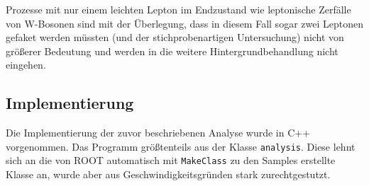 Prozesse mit nur einem leichten Lepton im Endzustand wie leptonische Zerfälle
von W-Bosonen sind mit der Überlegung, dass in diesem Fall sogar zwei Leptonen
gefaket werden müssten (und der stichprobenartigen Untersuchung) nicht von
größerer Bedeutung und werden in die weitere Hintergrundbehandlung nicht
eingehen.

\subsection{Implementierung}
Die Implementierung der zuvor beschriebenen Analyse wurde in C++ vorgenommen.
Das Programm größtenteils aus der Klasse \lstinline!analysis!. Diese lehnt sich
an die von ROOT automatisch mit \lstinline!MakeClass! zu den Samples erstellte
Klasse an, wurde aber aus Geschwindigkeitsgründen stark zurechtgestutzt.

